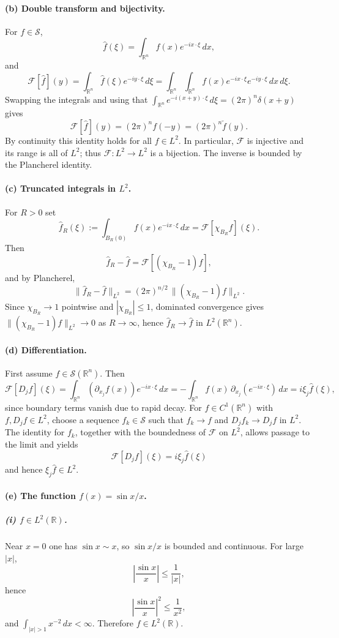 \documentclass[12pt,a4paper]{article}
\theoremstyle{plain}
\theoremstyle{definition}
\theoremstyle{remark}
\theoremstyle{remark}
\begin{document}
\paragraph{(b) Double transform and bijectivity.}
For $f\in\mathcal{S}$,
\[
\widehat{f}(\xi) = \int_{\mathbb{R}^n} f(x)e^{-ix\cdot\xi}\,dx,
\]
and
\[
\mathcal{F}[\widehat{f}](y)
= \int_{\mathbb{R}^n} \widehat{f}(\xi)e^{-iy\cdot\xi}\,d\xi
= \int_{\mathbb{R}^n}\!\!\int_{\mathbb{R}^n}
f(x)e^{-ix\cdot\xi}e^{-iy\cdot\xi}\,dx\,d\xi.
\]
Swapping the integrals and using that
$\int_{\mathbb{R}^n}e^{-i(x+y)\cdot\xi}\,d\xi = (2\pi)^n\delta(x+y)$ gives
\[
\mathcal{F}[\widehat{f}](y)
= (2\pi)^n f(-y)
= (2\pi)^n \check{f}(y).
\]
By continuity this identity holds for all $f\in L^2$.  In particular,
$\mathcal{F}$ is injective and its range is all of $L^2$; thus
$\mathcal{F}:L^2\to L^2$ is a bijection.  The inverse is bounded by the
Plancherel identity.

\paragraph{(c) Truncated integrals in $L^2$.}
For $R>0$ set
\[
\widehat{f}_R(\xi)
:= \int_{B_R(0)} f(x)e^{-ix\cdot\xi}\,dx
= \mathcal{F}[\chi_{B_R}f](\xi).
\]
Then
\[
\widehat{f}_R - \widehat{f}
= \mathcal{F}[(\chi_{B_R}-1)f],
\]
and by Plancherel,
\[
\|\widehat{f}_R - \widehat{f}\|_{L^2}
= (2\pi)^{n/2}\,\|(\chi_{B_R}-1)f\|_{L^2}.
\]
Since $\chi_{B_R}\to 1$ pointwise and $|\chi_{B_R}|\le 1$, dominated
convergence gives $\|(\chi_{B_R}-1)f\|_{L^2}\to 0$ as $R\to\infty$, hence
$\widehat{f}_R\to\widehat{f}$ in $L^2(\mathbb{R}^n)$.

\paragraph{(d) Differentiation.}
First assume $f\in\mathcal{S}(\mathbb{R}^n)$.  Then
\[
\mathcal{F}[D_j f](\xi)
= \int_{\mathbb{R}^n} (\partial_{x_j}f(x))e^{-ix\cdot\xi}\,dx
= -\int_{\mathbb{R}^n} f(x)\,\partial_{x_j}(e^{-ix\cdot\xi})\,dx
= i\xi_j\widehat{f}(\xi),
\]
since boundary terms vanish due to rapid decay.  For
$f\in C^1(\mathbb{R}^n)$ with $f,D_j f\in L^2$, choose a sequence
$f_k\in\mathcal{S}$ such that $f_k\to f$ and $D_j f_k\to D_j f$ in $L^2$.
The identity for $f_k$, together with the boundedness of $\mathcal{F}$ on
$L^2$, allows passage to the limit and yields
\[
\mathcal{F}[D_j f](\xi) = i\xi_j\widehat{f}(\xi)
\]
and hence $\xi_j\widehat{f}\in L^2$.

\paragraph{(e) The function $f(x)=\sin x/x$.}
\subparagraph*{(i) $f\in L^2(\mathbb{R})$.}
Near $x=0$ one has $\sin x\sim x$, so $\sin x/x$ is bounded and continuous.
For large $|x|$,
\[
\left|\frac{\sin x}{x}\right|
\le \frac{1}{|x|},
\]
hence
\[
\left|\frac{\sin x}{x}\right|^2 \le \frac{1}{x^2},
\]
and $\int_{|x|>1} x^{-2}\,dx<\infty$.  Therefore $f\in L^2(\mathbb{R})$.
\end{document}
